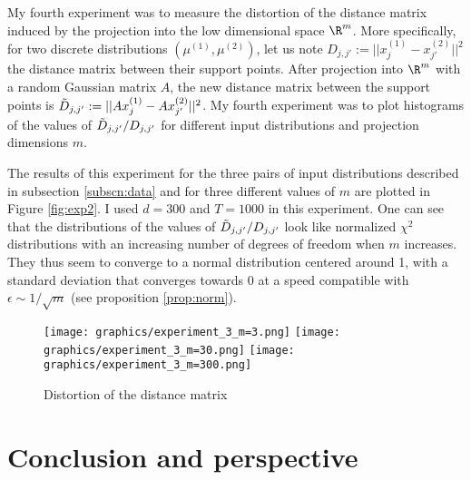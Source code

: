 \documentclass[11pt,a4paper]{article}
\begin{document}
My fourth experiment was to measure the distortion of the distance matrix induced by the projection into the low dimensional space $\R^m$. More specifically, for two discrete distributions $(\mu^{(1)}, \mu^{(2)})$, let us note $D_{j, j'} := ||x^{(1)}_j - x^{(2)}_{j'}||^2$ the distance matrix between their support points. After projection into $\R^m$ with a random Gaussian matrix $A$, the new distance matrix between the support points is $\Tilde{D}_{j, j'} := ||Ax^{(1)}_j - Ax^{(2)}_{j'}||^2$. My fourth experiment was to plot histograms of the values of $\Tilde{D}_{j, j'} / D_{j, j'}$ for different input distributions and projection dimensions $m$.

The results of this experiment for the three pairs of input distributions described in subsection \ref{subscn:data} and for three different values of $m$ are plotted in Figure \ref{fig:exp2}. I used $d=300$ and $T=1000$ in this experiment. One can see that the distributions of the values of $\Tilde{D}_{j, j'} / D_{j, j'}$ look like normalized $\chi^2$ distributions with an increasing number of degrees of freedom when $m$ increases. They thus seem to converge to a normal distribution centered around 1, with a standard deviation that converges towards $0$ at a speed compatible with $\epsilon \sim 1 / \sqrt{m}$ (see proposition \ref{prop:norm}).

\begin{figure*}
  \centering
  \texttt{[image: graphics/experiment\_3\_m=3.png]}
  \texttt{[image: graphics/experiment\_3\_m=30.png]}
  \texttt{[image: graphics/experiment\_3\_m=300.png]}
  \caption{Distortion of the distance matrix}
  \label{fig:exp3}
\end{figure*}

\section{Conclusion and perspective}
\end{document}
